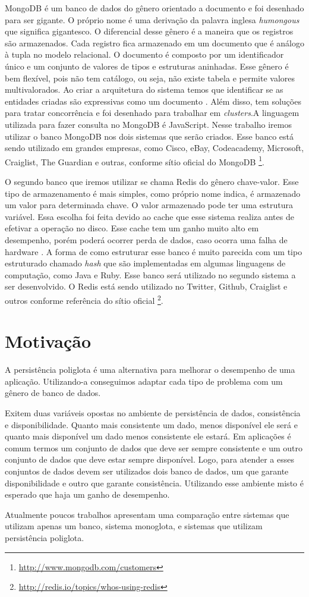 MongoDB é um banco de dados do gênero orientado a documento e foi desenhado para ser gigante. O próprio nome é uma derivação da palavra inglesa \textit{humongous} que significa gigantesco. O diferencial desse gênero é a maneira que os registros são armazenados. Cada registro fica armazenado em um documento que é análogo à tupla no modelo relacional. O documento é composto por um identificador único e um conjunto de valores de tipos e estruturas aninhadas. Esse gênero é bem flexível, pois não tem catálogo, ou seja, não existe tabela e permite valores multivalorados. Ao criar a arquitetura do sistema temos que identificar se as entidades criadas são expressivas como um documento \cite{SDSW}. Além disso, tem soluções para tratar concorrência e foi desenhado para trabalhar em \textit{clusters}.A linguagem utilizada para fazer consulta no MongoDB é JavaScript. Nesse trabalho iremos utilizar o banco MongoDB nos dois sistemas que serão criados. Esse banco está sendo utilizado em grandes empresas, como Cisco, eBay, Codeacademy, Microsoft, Craiglist, The Guardian e outras, conforme sítio oficial do MongoDB \footnote{\url{http://www.mongodb.com/customers}}.

O segundo banco que iremos utilizar se chama \ac{Redis} do gênero chave-valor. Esse tipo de armazenamento é mais simples, como próprio nome indica, é armazenado um valor para determinada chave. O valor armazenado pode ter uma estrutura variável. Essa escolha foi feita devido ao cache que esse sistema realiza antes de efetivar a operação no disco. Esse cache tem um ganho muito alto em desempenho, porém poderá ocorrer perda de dados, caso ocorra uma falha de hardware \cite{SDSW}. A forma de como estruturar esse banco é muito parecida com um tipo estruturado chamado \textit{hash} que são implementadas em algumas linguagens de computação, como Java e Ruby. Esse banco será utilizado no segundo sistema a ser desenvolvido. O \ac{Redis} está sendo utilizado no Twitter, Github, Craiglist e outros conforme referência do sítio oficial \footnote{\url{http://redis.io/topics/whos-using-redis}}.


\section{Motivação}
\label{sec:motivacao}
A persistência poliglota é uma alternativa para melhorar o desempenho de uma aplicação. Utilizando-a conseguimos adaptar cada tipo de problema com um gênero de banco de dados.

Exitem duas variáveis opostas no ambiente de persistência de dados, consistência e disponibilidade. Quanto mais consistente um dado, menos disponível ele será e quanto mais disponível um dado menos consistente ele estará. Em aplicações é comum termos um conjunto de dados que deve ser sempre consistente e um outro conjunto de dados que deve estar sempre disponível. Logo, para atender a esses conjuntos de dados devem ser utilizados dois banco de dados, um que garante disponibilidade e outro que garante  consistência. Utilizando esse ambiente misto é esperado que haja um ganho de desempenho.

Atualmente poucos trabalhos apresentam uma comparação entre sistemas que utilizam apenas um banco, sistema monoglota,  e sistemas que utilizam persistência poliglota.




